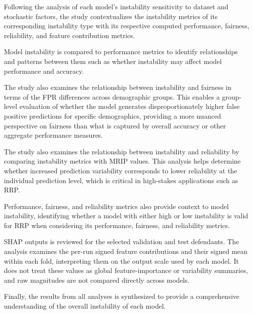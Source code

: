 \documentclass[12pt]{article}
\begin{document}
\begin{enumerate}

  Following the analysis of each model's instability sensitivity to dataset and stochastic factors, the study contextualizes the instability metrics of its corresponding instability type with its respective computed performance, fairness, reliability, and feature contribution metrics. 

  Model instability is compared to performance metrics to identify relationships and patterns between them such as  whether instability may affect model performance and accuracy. 

  The study also examines the relationship between instability and fairness in terms of the FPR differences across demographic groups. This enables a group-level evaluation of whether the model generates disproportionately higher false positive predictions for specific demographics, providing a more nuanced perspective on fairness than what is captured by overall accuracy or other aggregate performance measures.

  The study also examines the relationship between instability and reliability by comparing instability metrics with MRIP values. This analysis helps determine whether increased prediction variability corresponds to lower reliability at the individual prediction level, which is critical in high-stakes applications such as RRP.\@

  Performance, fairness, and reliability metrics also provide context to model instability, identifying whether a model with either high or low instability is valid for RRP when considering its performance, fairness, and reliability metrics.

  SHAP outputs is reviewed for the selected validation and test defendants. The analysis examines the per-run signed feature contributions and their signed mean within each fold, interpreting them on the output scale used by each model. It does not treat these values as global feature-importance or variability summaries, and raw magnitudes are not compared directly across models.

  Finally, the results from all analyses is synthesized to provide a comprehensive understanding of the overall instability of each model. 
\end{enumerate}
\newpage
\end{document}
